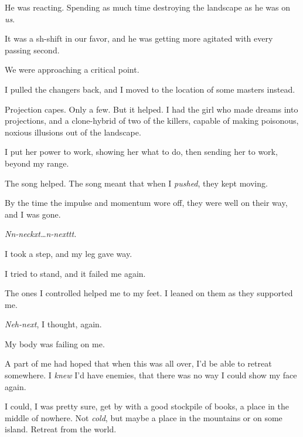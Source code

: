 He was reacting.  Spending as much time destroying the landscape as he was on \emph{us}.



It was a sh-shift in our favor, and he was getting more agitated with every passing second.



We were approaching a critical point.



I pulled the changers back, and I moved to the location of some masters instead.



Projection capes.  Only a few.  But it helped.  I had the girl who made dreams into projections, and a clone-hybrid of two of the killers, capable of making poisonous, noxious illusions out of the landscape.



I put her power to work, showing her what to do, then sending her to work, beyond my range.



The song helped.  The song meant that when I \emph{pushed}, they kept moving.



By the time the impulse and momentum wore off, they were well on their way, and I was gone.



\emph{Nn-neckxt\ldots n-nexttt.}



I took a step, and my leg gave way.



I tried to stand, and it failed me again.



The ones I controlled helped me to my feet.  I leaned on them as they supported me.



\emph{Neh-next}, I thought, again.



My body was failing on me.



A part of me had hoped that when this was all over, I'd be able to retreat somewhere.  I \emph{knew} I'd have enemies, that there was no way I could show my face again.



I could, I was pretty sure, get by with a good stockpile of books, a place in the middle of nowhere.  Not \emph{cold}, but maybe a place in the mountains or on some island.  Retreat from the world.



